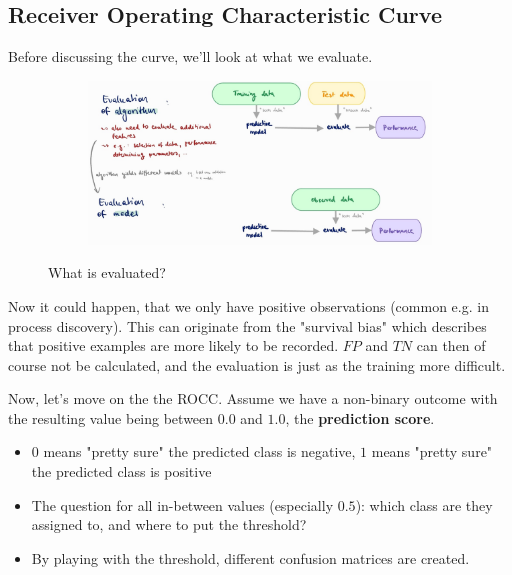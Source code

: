 \subsection{Receiver Operating Characteristic Curve}

Before discussing the curve, we'll look at what we evaluate. 
\begin{figure}[H]
  \centering
  \begin{subfigure}{0.9\textwidth}
    \centering
    \includegraphics[width=\textwidth]{assets/sl/ct__evaluation.jpg}
  \end{subfigure}

  \caption{What is evaluated?}
  \label{fig:7_rocc_evaluation}
\end{figure}

Now it could happen, that we only have positive observations (common e.g. in process discovery). This can originate from the "survival bias" which describes that positive examples are more likely to be recorded. $FP$ and $TN$ can then of course not be calculated, and the evaluation is just as the training more difficult.

Now, let's move on the the ROCC. Assume we have a non-binary outcome with the resulting value being between $0.0$ and $1.0$, the \textbf{prediction score}.
\begin{itemize}
  \item $0$ means "pretty sure" the predicted class is negative, $1$ means "pretty sure" the predicted class is positive
  \item The question for all in-between values (especially $0.5$): which class are they assigned to, and where to put the threshold?
  \item By playing with the threshold, different confusion matrices are created. 
\end{itemize}

